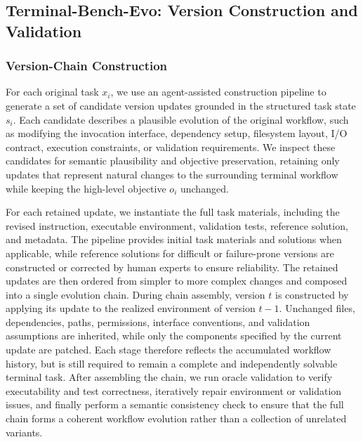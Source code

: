 \documentclass{article}
\begin{document}
\subsection{Terminal-Bench-Evo: Version Construction and Validation}
\label{app:terminal_validation}

\subsubsection{Version-Chain Construction}
\label{app:terminal_version_construction}
For each original task $x_i$, we use an agent-assisted construction pipeline to generate a set of candidate version updates grounded in the structured task state $s_i$. Each candidate describes a plausible evolution of the original workflow, such as modifying the invocation interface, dependency setup, filesystem layout, I/O contract, execution constraints, or validation requirements. We inspect these candidates for semantic plausibility and objective preservation, retaining only updates that represent natural changes to the surrounding terminal workflow while keeping the high-level objective $o_i$ unchanged.

For each retained update, we instantiate the full task materials, including the revised instruction, executable environment, validation tests, reference solution, and metadata. The pipeline provides initial task materials and solutions when applicable, while reference solutions for difficult or failure-prone versions are constructed or corrected by human experts to ensure reliability. The retained updates are then ordered from simpler to more complex changes and composed into a single evolution chain. During chain assembly, version $t$ is constructed by applying its update to the realized environment of version $t-1$. Unchanged files, dependencies, paths, permissions, interface conventions, and validation assumptions are inherited, while only the components specified by the current update are patched. Each stage therefore reflects the accumulated workflow history, but is still required to remain a complete and independently solvable terminal task. After assembling the chain, we run oracle validation to verify executability and test correctness, iteratively repair environment or validation issues, and finally perform a semantic consistency check to ensure that the full chain forms a coherent workflow evolution rather than a collection of unrelated variants.
\end{document}
